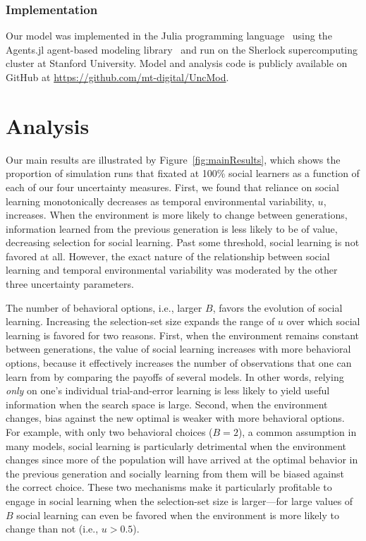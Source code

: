 \documentclass[letterpaper,11.5pt]{scrartcl}
\begin{document}
\subsubsection{Implementation}

Our model was implemented in the Julia programming language~\citep{Bezanson2017} 
using the Agents.jl agent-based modeling library~\citep{Datseris2022} and run
on the Sherlock supercomputing cluster at Stanford University. Model and analysis code is publicly available on GitHub at \url{https://github.com/mt-digital/UncMod}.


\section{Analysis}

Our main results are illustrated by Figure~\ref{fig:mainResults}, which shows the
proportion of simulation runs that fixated at 100\% social learners as a function of
each of our four uncertainty measures. First, we found that reliance on social
learning monotonically decreases as temporal environmental variability, $u$,
increases. When the environment is more likely to change between generations,
information learned from the previous generation is less likely to be of value,
decreasing selection for social learning. Past some threshold, social learning is
not favored at all. However, the exact nature of the relationship between social
learning and temporal environmental variability was moderated by the other three uncertainty parameters. 

The number of behavioral options, i.e., larger $B$, favors the evolution of social learning. Increasing the selection-set size
expands the range of $u$ over which social learning is favored for two reasons. First, when the environment remains constant between
generations, the value of social learning increases with more behavioral options, because it effectively increases the number of
observations that one can learn from by comparing the payoffs of several models. In other words, relying \emph{only} on one's
individual trial-and-error learning is less likely to yield useful information when the search space is large. Second, when the environment changes, bias against the new optimal is weaker with more behavioral options. For example, with only two behavioral choices ($B = 2$), a common assumption in many models, social learning is particularly detrimental when the environment changes since more of the population will have arrived at the optimal behavior in the previous generation and socially learning from them will be biased against the correct choice. These two mechanisms make it particularly profitable to engage in social learning when the selection-set size is larger---for large values of $B$ social learning can even be favored when the environment is more likely to change than not (i.e., $u>0.5$). 
\end{document}
